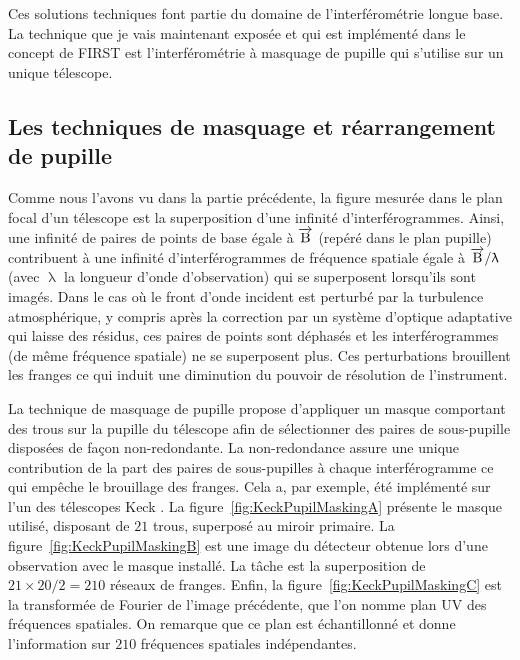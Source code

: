Ces solutions techniques font partie du domaine de l'interférométrie longue base. La technique que je vais maintenant exposée et qui est implémenté dans le concept de \ac{FIRST} est l'interférométrie à masquage de pupille qui s'utilise sur un unique télescope.


\subsection{Les techniques de masquage et réarrangement de pupille}
\label{sec:PupilMasking}

Comme nous l'avons vu dans la partie précédente, la figure mesurée dans le plan focal d'un télescope est la superposition d'une infinité d'interférogrammes. Ainsi, une infinité de paires de points de base égale à $\overrightarrow{\text{B}}$ (repéré dans le plan pupille) contribuent à une infinité d'interférogrammes de fréquence spatiale égale à $\overrightarrow{\text{B}} / \uplambda$ (avec $\uplambda$ la longueur d'onde d'observation) qui se superposent lorsqu'ils sont imagés. Dans le cas où le front d'onde incident est perturbé par la turbulence atmosphérique, y compris après la correction par un système d'optique adaptative qui laisse des résidus, ces paires de points sont déphasés et les interférogrammes (de même fréquence spatiale) ne se superposent plus. Ces perturbations brouillent les franges ce qui induit une diminution du pouvoir de résolution de l'instrument. 

La technique de masquage de pupille \citep{baldwin1986, haniff1987} propose d'appliquer un masque comportant des trous sur la pupille du télescope afin de sélectionner des paires de sous-pupille disposées de façon non-redondante. La non-redondance assure une unique contribution de la part des paires de sous-pupilles à chaque interférogramme ce qui empêche le brouillage des franges. Cela a, par exemple, été implémenté sur l'un des télescopes Keck \citep{tuthill2000}. La figure~\ref{fig:KeckPupilMaskingA} présente le masque utilisé, disposant de $21$ trous, superposé au miroir primaire. La figure~\ref{fig:KeckPupilMaskingB} est une image du détecteur obtenue lors d'une observation avec le masque installé. La tâche est la superposition de $21 \times 20 / 2 = 210$ réseaux de franges. Enfin, la figure~\ref{fig:KeckPupilMaskingC} est la transformée de Fourier de l'image précédente, que l'on nomme plan UV des fréquences spatiales. On remarque que ce plan est échantillonné et donne l'information sur $210$ fréquences spatiales indépendantes.

